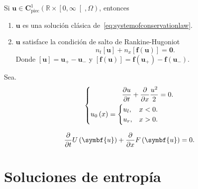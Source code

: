\begin{theorem}
	Si
	\begin{math}
		\symbf{u}\in
		\symbf{C}^{1}_{\text{piec}}
		\left(\mathbb{R}\times\left[0,\infty\right[,\Omega\right)
	\end{math},
	entonces
	\begin{enumerate}%
		\item

		      $\symbf{u}$ es una solución clásica
		      de~\eqref{eq:systemofconservationlaw}.

		\item

		      $\symbf{u}$ satisface la condición de salto de
		      Rankine-Hugoniot
		      \begin{equation*}
			      n_{t}
			      \left[\symbf{u}\right]+
			      n_{x}
			      \left[\symbf{f}\left(\symbf{u}\right)\right]=
			      \symbf{0}.
		      \end{equation*}
		      Donde
		      $\left[\symbf{u}\right]=\symbf{u}_{+}-\symbf{u}_{-}$ y
		      \begin{math}
			      \left[\symbf{f}\left(\symbf{u}\right)\right]=
			      \symbf{f}\left(\symbf{u}_{+}\right)-
			      \symbf{f}\left(\symbf{u}_{-}\right)
		      \end{math}.
	\end{enumerate}
\end{theorem}

\begin{example}[]
	Sea.
	\begin{equation*}
		\left\{
		\begin{aligned}
			\diffp{u}{t}+
			\diffp{}{x}
			\frac{u^{2}}{2} & =
			0.                  \\
			u_{0}\left(x\right)=
			\begin{cases}
				u_{l}, & x<0. \\
				u_{r}, & x>0.
			\end{cases}
		\end{aligned}
		\right.
	\end{equation*}
\end{example}

\begin{equation*}
	\diffp{}{t}
	U\left(\symbf{u}\right)+
	\diffp{}{x}
	F\left(\symbf{u}\right)=
	0.
\end{equation*}

\section{Soluciones de entropía}

